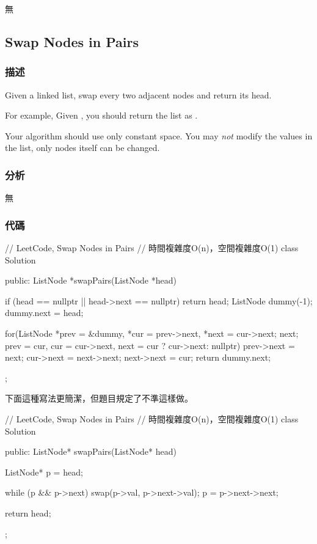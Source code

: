 \begindot
\item 無
\myenddot


\subsection{Swap Nodes in Pairs}
\label{sec:swap-nodes-in-pairs}


\subsubsection{描述}
Given a linked list, swap every two adjacent nodes and return its head.

For example,
Given , you should return the list as .

Your algorithm should use only constant space. You may \emph{not} modify the values in the list, only nodes itself can be changed.


\subsubsection{分析}
無


\subsubsection{代碼}
\begin{Code}
// LeetCode, Swap Nodes in Pairs
// 時間複雜度O(n)，空間複雜度O(1)
class Solution {
public:
    ListNode *swapPairs(ListNode *head) {
        if (head == nullptr || head->next == nullptr) return head;
        ListNode dummy(-1);
        dummy.next = head;

        for(ListNode *prev = &dummy, *cur = prev->next, *next = cur->next;
                next;
                prev = cur, cur = cur->next, next = cur ? cur->next: nullptr) {
            prev->next = next;
            cur->next = next->next;
            next->next = cur;
        }
        return dummy.next;
    }
};
\end{Code}

下面這種寫法更簡潔，但題目規定了不準這樣做。
\begin{Code}
// LeetCode, Swap Nodes in Pairs
// 時間複雜度O(n)，空間複雜度O(1)
class Solution {
public:
    ListNode* swapPairs(ListNode* head) {
        ListNode* p = head;

        while (p && p->next) {
            swap(p->val, p->next->val);
            p = p->next->next;
        }

        return head;
    }
};
\end{Code}

